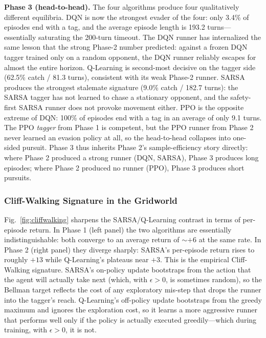 \documentclass[conference]{IEEEtran}
\begin{document}
\textbf{Phase 3 (head-to-head).} The four algorithms produce four
qualitatively different equilibria. DQN is now the strongest evader of
the four: only 3.4\% of episodes end with a tag, and the average
episode length is 193.2 turns---essentially saturating the 200-turn
timeout. The DQN runner has internalized the same lesson that the
strong Phase-2 number predicted: against a frozen DQN tagger trained
only on a random opponent, the DQN runner reliably escapes for almost
the entire horizon. Q-Learning is second-most decisive on the tagger
side (62.5\% catch / 81.3 turns), consistent with its weak Phase-2
runner. SARSA produces the strongest stalemate signature (9.0\% catch
/ 182.7 turns): the SARSA tagger has not learned to chase a
stationary opponent, and the safety-first SARSA runner does not
provoke movement either. PPO is the opposite extreme of DQN: 100\% of
episodes end with a tag in an average of only 9.1 turns. The PPO
\emph{tagger} from Phase 1 is competent, but the PPO runner from
Phase 2 never learned an evasion policy at all, so the head-to-head
collapses into one-sided pursuit. Phase 3 thus inherits Phase 2's
sample-efficiency story directly: where Phase 2 produced a strong
runner (DQN, SARSA), Phase 3 produces long episodes; where Phase 2
produced no runner (PPO), Phase 3 produces short pursuits.

\subsubsection{Cliff-Walking Signature in the Gridworld}\label{sec:res-cliff}

Fig.~\ref{fig:cliffwalking} sharpens the SARSA/Q-Learning contrast in
terms of per-episode return. In Phase 1 (left panel) the two algorithms
are essentially indistinguishable: both converge to an average return
of $\sim{+}6$ at the same rate. In Phase 2 (right panel) they diverge
sharply: SARSA's per-episode return rises to roughly $+13$ while
Q-Learning's plateaus near $+3$. This is the empirical Cliff-Walking
signature. SARSA's on-policy update bootstraps from the action that the
agent will actually take next (which, with $\epsilon > 0$, is sometimes
random), so the Bellman target reflects the cost of any exploratory
mis-step that drops the runner into the tagger's reach. Q-Learning's
off-policy update bootstraps from the greedy maximum and ignores the
exploration cost, so it learns a more aggressive runner that performs
well only if the policy is actually executed greedily---which during
training, with $\epsilon > 0$, it is not.
\end{document}

